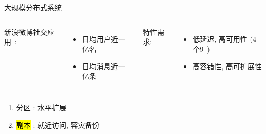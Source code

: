 \begin{frame}{}
  \begin{columns}
    \pause
      \centerline{\hl{}}
  \end{columns}
\end{frame}

\begin{frame}{}
  \centerline{\Large 大规模分布式系统}

  \vspace{0.50cm}

  \begin{columns}
    新浪微博社交应用~\footnotemark:
    \begin{itemize}
      \item 日均用户近一亿名
      \item 日均消息近一亿条
    \end{itemize}
    \pause
    特性需求: 
    \begin{itemize}
      \item 低延迟, 高可用性 (4个9~\footnotemark)
      \item 高容错性, 高可扩展性
    \end{itemize}
  \end{columns}
  
\end{frame}
\begin{frame}{}
  \graphicspath{{tikz/}}
  \begin{figure}[h!]
    \centering
    \begin{adjustbox}{max totalsize = {0.50\textwidth}{1.00\textheight}, center}
      
    \end{adjustbox}
  \end{figure}

  \vspace{0.20cm}
  \begin{center}
    \begin{minipage}{0.65\textwidth}

      \vspace{0.20cm}
      \begin{enumerate}
	\item<2-> 分区 : 水平扩展
	\item<3-> \hl{副本 }: 就近访问, 容灾备份
      \end{enumerate}
    \end{minipage}
  \end{center}
\end{frame}


